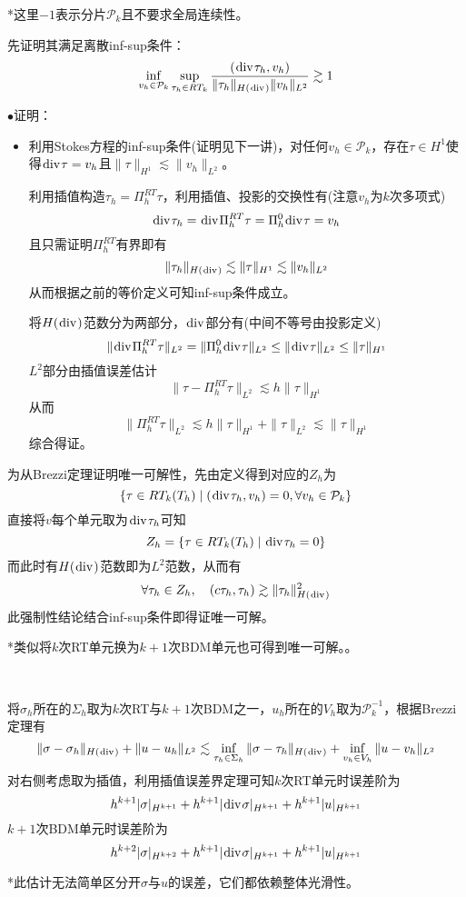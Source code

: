 \documentclass[a4paper,UTF8,fontset=windows]{ctexart}
\newcommand*{\cp}{\mathcal{P}}
\renewcommand*{\div}{\hspace{0.07em}\mathrm{div}\hspace{0.07em}}
\newcommand{\proo}[1]{{\kaishu $\bullet$证明：
\begin{itemize}
    \item[] #1
\end{itemize}
}}
\begin{document}
*这里$-1$表示分片$\cp_k$且不要求全局连续性。

先证明其满足离散inf-sup条件：
$$\inf_{v_h\in\cp_k}\sup_{\tau_h\in RT_k}\frac{(\div\tau_h,v_h)}{\|\tau_h\|_{H(\div)}\|v_h\|_{L^2}}\gtrsim1$$
\proo{
    利用Stokes方程的inf-sup条件(证明见下一讲)，对任何$v_h\in\cp_k$，存在$\tau\in H^1$使得$\div\tau=v_h$且$\|\tau\|_{H^1}\lesssim\|v_h\|_{L^2}$。

    利用插值构造$\tau_h=\Pi_h^{RT}\tau$，利用插值、投影的交换性有(注意$v_h$为$k$次多项式)
    $$\div\tau_h=\div\Pi_h^{RT}\tau=\Pi_h^0\div\tau=v_h$$
    且只需证明$\Pi_h^{RT}$有界即有
    $$\|\tau_h\|_{H(\div)}\lesssim\|\tau\|_{H^1}\lesssim\|v_h\|_{L^2}$$
    从而根据之前的等价定义可知inf-sup条件成立。

    将$H(\div)$范数分为两部分，$\div$部分有(中间不等号由投影定义)
    $$\|\div\Pi_h^{RT}\tau\|_{L^2}=\|\Pi_h^0\div\tau\|_{L^2}\le\|\div\tau\|_{L^2}\le\|\tau\|_{H^1}$$
    $L^2$部分由插值误差估计
    $$\|\tau-\Pi_h^{RT}\tau\|_{L^2}\lesssim h\|\tau\|_{H^1}$$
    从而
    $$\|\Pi_h^{RT}\tau\|_{L^2}\lesssim h\|\tau\|_{H^1}+\|\tau\|_{L^2}\lesssim\|\tau\|_{H^1}$$
    综合得证。
}
为从Brezzi定理证明唯一可解性，先由定义得到对应的$Z_h$为
$$\{\tau\in RT_k(T_h)\mid(\div\tau_h,v_h)=0,\forall v_h\in\cp_k\}$$
直接将$v$每个单元取为$\div\tau_h$可知
$$Z_h=\{\tau\in RT_k(T_h)\mid\div\tau_h=0\}$$
而此时有$H(\div)$范数即为$L^2$范数，从而有
$$\forall \tau_h\in Z_h,\quad(c\tau_h,\tau_h)\gtrsim\|\tau_h\|_{H(\div)}^2$$
此强制性结论结合inf-sup条件即得证唯一可解。

*类似将$k$次RT单元换为$k+1$次BDM单元也可得到唯一可解。。

\

将$\sigma_h$所在的$\Sigma_h$取为$k$次RT与$k+1$次BDM之一，$u_h$所在的$V_h$取为$\cp_k^{-1}$，根据Brezzi定理有
$$\|\sigma-\sigma_h\|_{H(\div)}+\|u-u_h\|_{L^2}\lesssim\inf_{\tau_h\in\Sigma_h}\|\sigma-\tau_h\|_{H(\div)}+\inf_{v_h\in V_h}\|u-v_h\|_{L^2}$$
对右侧考虑取为插值，利用插值误差界定理可知$k$次RT单元时误差阶为
$$h^{k+1}|\sigma|_{H^{k+1}}+h^{k+1}|\div\sigma|_{H^{k+1}}+h^{k+1}|u|_{H^{k+1}}$$
$k+1$次BDM单元时误差阶为
$$h^{k+2}|\sigma|_{H^{k+2}}+h^{k+1}|\div\sigma|_{H^{k+1}}+h^{k+1}|u|_{H^{k+1}}$$

*此估计无法简单区分开$\sigma$与$u$的误差，它们都依赖整体光滑性。
\end{document}
